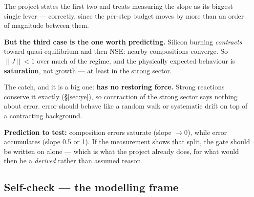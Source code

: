The project states the first two and treats measuring the slope as its biggest
single lever --- correctly, since the per-step \Ye{} budget moves by more than an
order of magnitude between them.

\textbf{But the third case is the one worth predicting.} Silicon burning
\emph{contracts} toward quasi-equilibrium and then NSE: nearby compositions
converge. So $\|J\| < 1$ over much of the regime, and the physically expected
behaviour is \textbf{saturation}, not growth --- at least in the strong sector.

The catch, and it is a big one: \textbf{\Ye{} has no restoring force.} Strong
reactions conserve it exactly (\S\ref{sec:ye}), so contraction of the strong
sector says nothing about \Ye{} error. \Ye{} error should behave like a random
walk or systematic drift on top of a contracting background.

\begin{aside}
\textbf{Prediction to test:} composition errors saturate (slope $\to 0$), while
\Ye{} error accumulates (slope 0.5 or 1). If the measurement shows that split,
the gate should be written on \Ye{} alone --- which is what the project already
does, for what would then be a \emph{derived} rather than assumed reason.
\end{aside}

\subsection*{Self-check --- the modelling frame}
\label{sec:selfcheck-frame}

